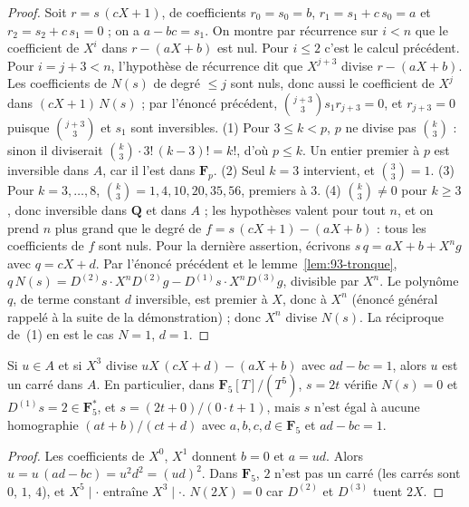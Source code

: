 \begin{proof}
Soit $r = s\,(cX + 1)$, de coefficients $r_0 = s_0 = b$, $r_1 = s_1 + c\,s_0 = a$ et $r_2 = s_2 + c\,s_1 = 0$ ; on a $a - bc = s_1$. On montre par récurrence sur $i < n$ que le coefficient de $X^i$ dans $r - (aX + b)$ est nul. Pour $i \leq 2$ c'est le calcul précédent. Pour $i = j + 3 < n$, l'hypothèse de récurrence dit que $X^{j+3}$ divise $r - (aX + b)$. Les coefficients de $N(s)$ de degré $\leq j$ sont nuls, donc aussi le coefficient de $X^j$ dans $(cX + 1)\,N(s)$ ; par l'énoncé précédent, $\binom{j+3}{3} s_1 r_{j+3} = 0$, et $r_{j+3} = 0$ puisque $\binom{j+3}3$ et $s_1$ sont inversibles. (1) Pour $3 \leq k < p$, $p$ ne divise pas $\binom k3$ : sinon il diviserait $\binom k3 \cdot 3!\,(k-3)! = k!$, d'où $p \leq k$. Un entier premier à $p$ est inversible dans $A$, car il l'est dans $\mathbf F_p$. (2) Seul $k = 3$ intervient, et $\binom 33 = 1$. (3) Pour $k = 3, \dots, 8$, $\binom k3 = 1, 4, 10, 20, 35, 56$, premiers à $3$. (4) $\binom k3 \neq 0$ pour $k \geq 3$, donc inversible dans $\mathbf Q$ et dans $A$ ; les hypothèses valent pour tout $n$, et on prend $n$ plus grand que le degré de $f = s\,(cX + 1) - (aX + b)$ : tous les coefficients de $f$ sont nuls. Pour la dernière assertion, écrivons $s\,q = aX + b + X^n g$ avec $q = cX + d$. Par l'énoncé précédent et le lemme~\ref{lem:93-tronque}, $q\,N(s) = D^{(2)}s \cdot X^n D^{(2)} g - D^{(1)}s \cdot X^n D^{(3)} g$, divisible par $X^n$. Le polynôme $q$, de terme constant $d$ inversible, est premier à $X$, donc à $X^n$ (énoncé général rappelé à la suite de la démonstration) ; donc $X^n$ divise $N(s)$. La réciproque de~(1) en est le cas $N = 1$, $d = 1$.
\end{proof}

\begin{encadre}
\begin{contrexemple}
Si $u \in A$ et si $X^3$ divise $uX\,(cX + d) - (aX + b)$ avec $ad - bc = 1$, alors $u$ est un carré dans $A$. En particulier, dans $\mathbf F_5[T]/(T^5)$, $s = 2t$ vérifie $N(s) = 0$ et $D^{(1)} s = 2 \in \mathbf F_5^*$, et $s = (2t + 0)/(0 \cdot t + 1)$, mais $s$ n'est égal à aucune homographie $(at + b)/(ct + d)$ avec $a, b, c, d \in \mathbf F_5$ et $ad - bc = 1$.
\end{contrexemple}
\end{encadre}

\begin{proof}
Les coefficients de $X^0$, $X^1$ donnent $b = 0$ et $a = ud$. Alors $u = u\,(ad - bc) = u^2 d^2 = (ud)^2$. Dans $\mathbf F_5$, $2$ n'est pas un carré (les carrés sont $0$, $1$, $4$), et $X^5 \mid \cdot$ entraîne $X^3 \mid \cdot$. $N(2X) = 0$ car $D^{(2)}$ et $D^{(3)}$ tuent $2X$.
\end{proof}

